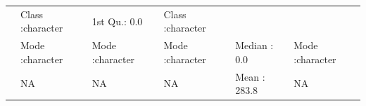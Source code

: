\documentclass[]{article}
\begin{document}
\begin{longtable}[]{@{}llllll@{}}
\begin{minipage}[t]{0.16\columnwidth}
\end{minipage} & \begin{minipage}[t]{0.16\columnwidth}\raggedright\strut
Class :character\strut
\end{minipage} & \begin{minipage}[t]{0.15\columnwidth}\raggedright\strut
1st Qu.: 0.0\strut
\end{minipage} & \begin{minipage}[t]{0.16\columnwidth}\raggedright\strut
Class :character\strut
\end{minipage}\tabularnewline
\begin{minipage}[t]{0.04\columnwidth}\raggedright\strut
\strut
\end{minipage} & \begin{minipage}[t]{0.16\columnwidth}\raggedright\strut
Mode :character\strut
\end{minipage} & \begin{minipage}[t]{0.16\columnwidth}\raggedright\strut
Mode :character\strut
\end{minipage} & \begin{minipage}[t]{0.16\columnwidth}\raggedright\strut
Mode :character\strut
\end{minipage} & \begin{minipage}[t]{0.15\columnwidth}\raggedright\strut
Median : 0.0\strut
\end{minipage} & \begin{minipage}[t]{0.16\columnwidth}\raggedright\strut
Mode :character\strut
\end{minipage}\tabularnewline
\begin{minipage}[t]{0.04\columnwidth}\raggedright\strut
\strut
\end{minipage} & \begin{minipage}[t]{0.16\columnwidth}\raggedright\strut
NA\strut
\end{minipage} & \begin{minipage}[t]{0.16\columnwidth}\raggedright\strut
NA\strut
\end{minipage} & \begin{minipage}[t]{0.16\columnwidth}\raggedright\strut
NA\strut
\end{minipage} & \begin{minipage}[t]{0.15\columnwidth}\raggedright\strut
Mean : 283.8\strut
\end{minipage} & \begin{minipage}[t]{0.16\columnwidth}\raggedright\strut
NA\strut
\end{minipage}\tabularnewline

\end{longtable}
\end{document}
